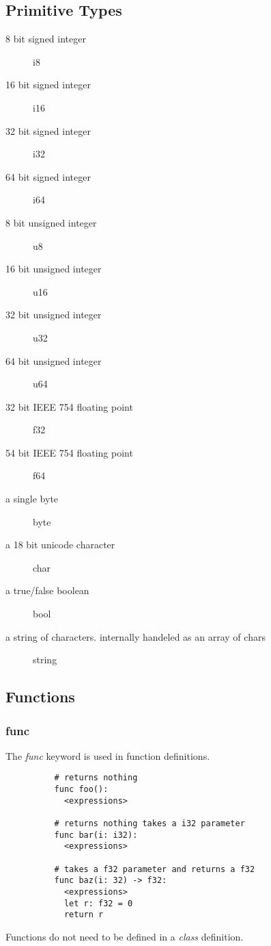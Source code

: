 \documentclass{article}
\newcommand{\subcentersec}[1]{\subsection*{\hfil #1 \hfil}}
\begin{document}
      \subcentersec{Primitive Types}
        \begin{description}
          \item [8 bit signed integer] {i8}
          \item [16 bit signed integer] {i16}
          \item [32 bit signed integer] {i32}
          \item [64 bit signed integer] {i64}

          \item [8 bit unsigned integer] {u8}
          \item [16 bit unsigned integer] {u16}
          \item [32 bit unsigned integer] {u32}
          \item [64 bit unsigned integer] {u64}

          \item [32 bit IEEE 754 floating point] {f32}
          \item [54 bit IEEE 754 floating point] {f64}

          \item [a single byte] {byte}

          \item [a 18 bit unicode character] {char}

          \item [a true/false boolean] {bool}

          \item [a string of characters. internally handeled as an array of chars] {string}
        \end{description}

    \subcentersec{Functions}
      \subsubsection*{func}
        The \textit{func} keyword is used in function definitions.
        \begin{verbatim}
          # returns nothing
          func foo():
            <expressions>

          # returns nothing takes a i32 parameter
          func bar(i: i32):
            <expressions>

          # takes a f32 parameter and returns a f32
          func baz(i: 32) -> f32:
            <expressions>
            let r: f32 = 0
            return r
        \end{verbatim}
        Functions do not need to be defined in a \textit{class} definition.
\end{document}
